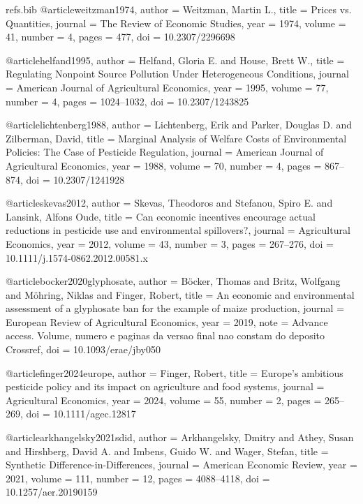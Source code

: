 \begin{filecontents*}[overwrite]{refs.bib}
@article{weitzman1974,
  author  = {Weitzman, Martin L.},
  title   = {Prices vs. Quantities},
  journal = {The Review of Economic Studies},
  year    = {1974},
  volume  = {41},
  number  = {4},
  pages   = {477},
  doi     = {10.2307/2296698}
}

@article{helfand1995,
  author  = {Helfand, Gloria E. and House, Brett W.},
  title   = {Regulating Nonpoint Source Pollution Under Heterogeneous Conditions},
  journal = {American Journal of Agricultural Economics},
  year    = {1995},
  volume  = {77},
  number  = {4},
  pages   = {1024--1032},
  doi     = {10.2307/1243825}
}

@article{lichtenberg1988,
  author  = {Lichtenberg, Erik and Parker, Douglas D. and Zilberman, David},
  title   = {Marginal Analysis of Welfare Costs of Environmental Policies: The Case of Pesticide Regulation},
  journal = {American Journal of Agricultural Economics},
  year    = {1988},
  volume  = {70},
  number  = {4},
  pages   = {867--874},
  doi     = {10.2307/1241928}
}

@article{skevas2012,
  author  = {Skevas, Theodoros and Stefanou, Spiro E. and Lansink, Alfons Oude},
  title   = {Can economic incentives encourage actual reductions in pesticide use and environmental spillovers?},
  journal = {Agricultural Economics},
  year    = {2012},
  volume  = {43},
  number  = {3},
  pages   = {267--276},
  doi     = {10.1111/j.1574-0862.2012.00581.x}
}

@article{bocker2020glyphosate,
  author  = {Böcker, Thomas and Britz, Wolfgang and Möhring, Niklas and Finger, Robert},
  title   = {An economic and environmental assessment of a glyphosate ban for the example of maize production},
  journal = {European Review of Agricultural Economics},
  year    = {2019},
  note    = {Advance access. Volume, numero e paginas da versao final nao constam do deposito Crossref},
  doi     = {10.1093/erae/jby050}
}

@article{finger2024europe,
  author  = {Finger, Robert},
  title   = {Europe's ambitious pesticide policy and its impact on agriculture and food systems},
  journal = {Agricultural Economics},
  year    = {2024},
  volume  = {55},
  number  = {2},
  pages   = {265--269},
  doi     = {10.1111/agec.12817}
}

@article{arkhangelsky2021sdid,
  author  = {Arkhangelsky, Dmitry and Athey, Susan and Hirshberg, David A. and Imbens, Guido W. and Wager, Stefan},
  title   = {Synthetic {Difference-in-Differences}},
  journal = {American Economic Review},
  year    = {2021},
  volume  = {111},
  number  = {12},
  pages   = {4088--4118},
  doi     = {10.1257/aer.20190159}
}


\end{filecontents*}
